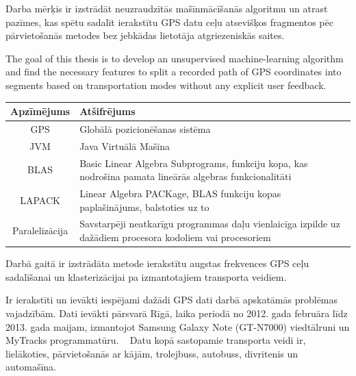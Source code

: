 \documentclass{ludis}
\begin{document}
\maketitle

\begin{abstract-lv}
  Darba mērķis ir izstrādāt neuzraudzītās mašīnmācīšanās algoritmu un atrast pazīmes, kas spētu
  sadalīt ierakstītu GPS datu ceļu atsevišķos fragmentos pēc pārvietošanās metodes bez jebkādas 
  lietotāja atgriezeniskās saites.
\end{abstract-lv}

\begin{abstract-en}
  The goal of this thesis is to develop an unsupervised machine-learning algo\-rithm and find the 
  necessary features to split a recorded path of GPS coordi\-nates into segments based on
  transportation modes without any explicit user feedback.
\end{abstract-en}

\tableofcontents

\setlength\LTleft{0pt}
\setlength\LTright{0pt}
\begin{longtable}{| c | p{28em} |}
  \hline
  \textbf{Apzīmējums} & \textbf{Atšifrējums}\\ 
  \endhead
  \hline
  GPS & Globālā pozicionēšanas sistēma\\
  JVM & Java Virtuālā Mašīna\\
  BLAS & Basic Linear Algebra Subprograms, funkciju kopa, kas nodrošina pamata lineārās algebras 
  funkcionalitāti\\
  LAPACK & Linear Algebra PACKage, BLAS funkciju kopas paplašinājums, balstoties uz to\\
  Paralelizācija & Savstarpēji neatkarīgu programmas daļu vienlaicīga izpilde uz dažādiem procesora
  kodoliem vai procesoriem\\
  \hline
\end{longtable}

Darbā gaitā ir izstrādāta metode ierakstītu augstas frekvences GPS ceļu sadalīšanai un 
klasterizācijai pa izmantotajiem transporta veidiem. 

Ir ierakstīti un ievākti iespējami dažādi GPS dati darbā apskatāmās prob\-lēmas vajadzībām. Dati
ievākti pārsvarā Rīgā, laika periodā no 2012. gada februāra līdz 2013. gada maijam, izmantojot Samsung
Galaxy Note (GT-N7000) viedtālruni un MyTracks programmatūru. ~\cite{mytracks} Datu kopā sastopamie
transporta veidi ir, lielākoties, pārvietošanās ar kājām, trolejbuss, autobuss, divritenis un 
automašīna.
\end{document}
